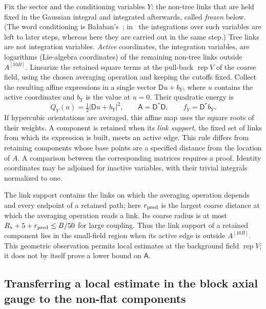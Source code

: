 Fix the sector and the conditioning variables $Y$: the non-tree links that are held fixed in the Gaussian integral and integrated afterwards, called \emph{frozen} below. (The word conditioning is Ba{\l}aban's~\cite{Balaban1988Cluster}; in~\cite{Balaban1988Expansions} the integrations over such variables are left to later steps, whereas here they are carried out in the same step.) Tree links are not integration
variables. \emph{Active} coordinates, the integration variables, are logarithms (Lie-algebra coordinates) of the remaining non-tree links
outside $A^{[10B]}$. Linearize the retained square
terms at the pull-back $\operatorname{rep}V$ of the coarse field, using the chosen averaging operation
and keeping the cutoffs fixed. Collect the resulting affine expressions
in a single vector $\mathsf D u+b_Y$, where $u$ contains the active
coordinates and $b_Y$ is the value at $u=0$. Their quadratic energy is
\begin{equation}
 Q_Y(u)=\tfrac12|\mathsf D u+b_Y|^2,\qquad
 \mathsf A=\mathsf D^*\mathsf D,\qquad f_Y=\mathsf D^*b_Y.
 \label{ch06:actual-matrix}
\end{equation}
If hypercubic orientations are averaged, this affine map uses the square roots
of their weights. A component is retained when its \emph{link support}, the fixed set of links from which its expression is built, meets an active
edge. This rule differs from retaining components whose base points are a specified
distance from the location of $A$. A comparison between the corresponding
matrices requires a proof. Identity coordinates may be adjoined for
inactive variables, with their trivial integrals normalized to one.

The link support contains the links on which the averaging operation depends and every endpoint of a retained
path; here $r_{\rm pred}$ is the largest coarse distance at which the averaging operation reads a link. Its coarse radius is at most $R_*+5+r_{\rm pred}\le B/50$ for large
coupling. Thus the link support of a retained component lies in the small-field region when its
active edge is outside $A^{[10B]}$. This geometric
observation permits local estimates at the background field $\operatorname{rep}V$; it does not by
itself prove a lower bound on $\mathsf A$.

\subsection{Transferring a local estimate in the block axial gauge to the non-flat components}

